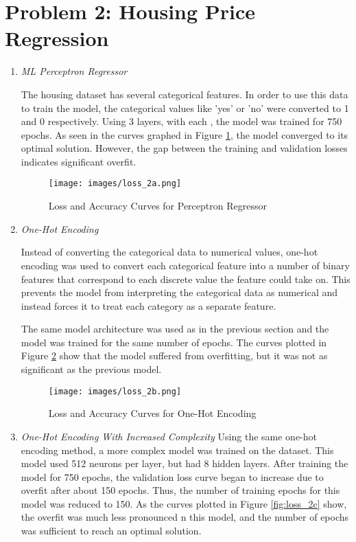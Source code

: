 \documentclass{article}
\begin{document}
\section{Problem 2: Housing Price Regression}
\begin{enumerate}[label=1\alph*. ]
    \item \textit{ML Perceptron Regressor}
    
    The housing dataset has several categorical features. In
    order to use this data to train the model, the
    categorical values like 'yes' or 'no' were converted to
    1 and 0 respectively. Using 3 layers, with each , the
    model was trained for 750 epochs. As seen in the curves
    graphed in Figure \ref{fig:loss_2a}, the model converged
    to its optimal solution. However, the gap between the
    training and validation losses indicates significant
    overfit.
    \begin{figure}[h]
        \centering
        \texttt{[image: images/loss\_2a.png]}
        \caption{Loss and Accuracy Curves for Perceptron Regressor}
        \label{fig:loss_2a}
    \end{figure}

    \item \textit{One-Hot Encoding}
    
    Instead of converting the categorical data to numerical
    values, one-hot encoding was used to convert each
    categorical feature into a number of binary features
    that correspond to each discrete value the feature could
    take on. This prevents the model from interpreting the
    categorical data as numerical and instead forces it to
    treat each category as a separate feature.
    
    The same model architecture was used as in the previous
    section and the model was trained for the same number of
    epochs. The curves plotted in Figure \ref{fig:loss_2b}
    show that the model suffered from overfitting, but it
    was not as significant as the previous model.
    \begin{figure}[h]
        \centering
        \texttt{[image: images/loss\_2b.png]}
        \caption{Loss and Accuracy Curves for One-Hot Encoding}
        \label{fig:loss_2b}
    \end{figure}

    \item \textit{One-Hot Encoding With Increased
    Complexity} Using the same one-hot encoding method, a more complex model was
    trained on the dataset. This model used 512 neurons per layer, but had 8
    hidden layers. After training the model for 750 epochs, the validation loss
    curve began to increase due to overfit after about 150 epochs. Thus, the
    number of training epochs for this model was reduced to 150. As the curves
    plotted in Figure \ref{fig:loss_2c} show, the overfit was much less
    pronounced n this model, and the number of epochs was sufficient to reach an
    optimal solution.


\end{enumerate}
\end{document}
